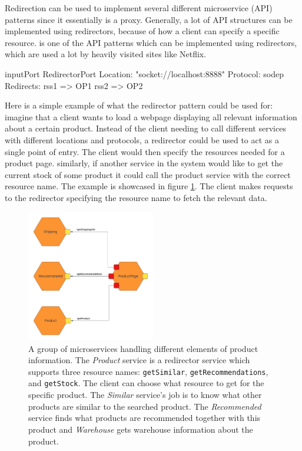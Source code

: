 Redirection can be used to implement several different microservice (API) patterns since it essentially is a proxy.
Generally, a lot of API structures can be implemented using redirectors, because of how a client can specify a specific resource.
 is one of the API patterns which can be implemented using redirectors, which are used a lot by heavily visited sites like Netflix.

\begin{jolisting}[][caption={Input port which redirects requests using resource names}, label=lst:redirector-inputport]
inputPort RedirectorPort {
    Location: "socket://localhost:8888"
    Protocol: sodep
    Redirects:
        rss1 => OP1
        rss2 => OP2
}
\end{jolisting}

Here is a simple example of what the redirector pattern could be used for: imagine that a client wants to load a webpage displaying all relevant information about a certain product.
Instead of the client needing to call different services with different locations and protocols, a redirector could be used to
act as a single point of entry. The client would then specify the resources needed for a product page. similarly, if another service in the system would like to get the current stock of some product it could call the product service with the correct resource name.
The example is showcased in figure \ref*{figure:redirector_example}. The client makes requests to the redirector specifying the resource name to fetch the relevant data.
\begin{figure}[h!]
    \center
    \includegraphics[width=0.5\textwidth]{figures/redirector_example.png}
    \caption{A group of microservices handling different elements of product information. The \textit{Product} service is a redirector service which supports three resource names:
    \texttt{getSimilar}, \texttt{getRecommendations}, and \texttt{getStock}. The client can choose what resource to get for the specific product. The \textit{Similar} service's job is to know what other products are similar to the searched product.
    The \textit{Recommended} service finds what products are recommended together with this product and \textit{Warehouse} gets warehouse information about the product.}
    \label{figure:redirector_example}
\end{figure}
